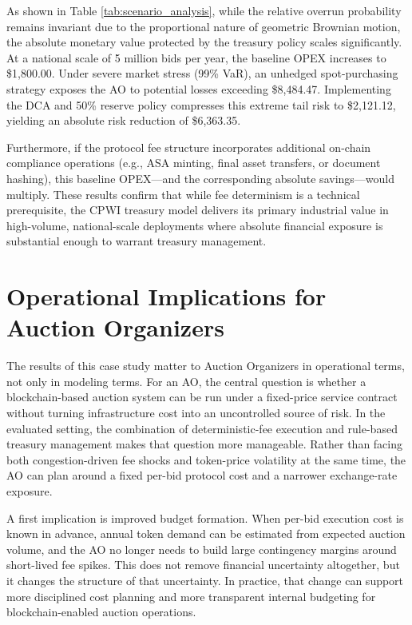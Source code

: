 \documentclass[runningheads]{llncs}
\begin{document}
As shown in Table \ref{tab:scenario_analysis}, while the relative overrun probability remains invariant due to the proportional nature of geometric Brownian motion, the absolute monetary value protected by the treasury policy scales significantly. At a national scale of 5 million bids per year, the baseline OPEX increases to \$1,800.00. Under severe market stress (99\% VaR), an unhedged spot-purchasing strategy exposes the AO to potential losses exceeding \$8,484.47. Implementing the DCA and 50\% reserve policy compresses this extreme tail risk to \$2,121.12, yielding an absolute risk reduction of \$6,363.35. 

Furthermore, if the protocol fee structure incorporates additional on-chain compliance operations (e.g., ASA minting, final asset transfers, or document hashing), this baseline OPEX---and the corresponding absolute savings---would multiply. These results confirm that while fee determinism is a technical prerequisite, the CPWI treasury model delivers its primary industrial value in high-volume, national-scale deployments where absolute financial exposure is substantial enough to warrant treasury management.


\section{Operational Implications for Auction Organizers}

The results of this case study matter to Auction Organizers in operational terms,
not only in modeling terms. For an AO, the central question is whether a
blockchain-based auction system can be run under a fixed-price service contract
without turning infrastructure cost into an uncontrolled source of risk. In the
evaluated setting, the combination of deterministic-fee execution and rule-based
treasury management makes that question more manageable. Rather than facing
both congestion-driven fee shocks and token-price volatility at the same time,
the AO can plan around a fixed per-bid protocol cost and a narrower exchange-rate
exposure.

A first implication is improved budget formation. When per-bid execution cost is
known in advance, annual token demand can be estimated from expected auction
volume, and the AO no longer needs to build large contingency margins around
short-lived fee spikes. This does not remove financial uncertainty altogether, but
it changes the structure of that uncertainty. In practice, that change can support
more disciplined cost planning and more transparent internal budgeting for
blockchain-enabled auction operations.
\end{document}
